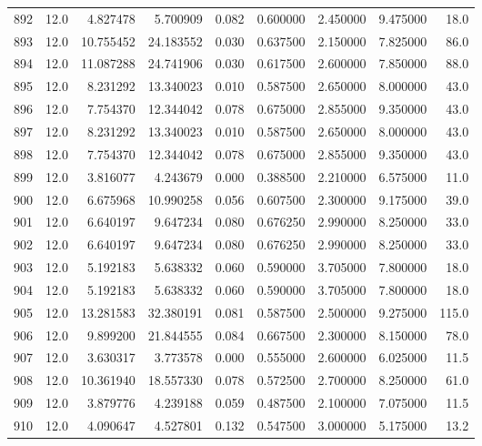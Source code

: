 \begin{tabular}{lrrrrrrrr}
892  &   12.0 &   4.827478 &   5.700909 &  0.082 &  0.600000 &  2.450000 &   9.475000 &   18.0 \\
893  &   12.0 &  10.755452 &  24.183552 &  0.030 &  0.637500 &  2.150000 &   7.825000 &   86.0 \\
894  &   12.0 &  11.087288 &  24.741906 &  0.030 &  0.617500 &  2.600000 &   7.850000 &   88.0 \\
895  &   12.0 &   8.231292 &  13.340023 &  0.010 &  0.587500 &  2.650000 &   8.000000 &   43.0 \\
896  &   12.0 &   7.754370 &  12.344042 &  0.078 &  0.675000 &  2.855000 &   9.350000 &   43.0 \\
897  &   12.0 &   8.231292 &  13.340023 &  0.010 &  0.587500 &  2.650000 &   8.000000 &   43.0 \\
898  &   12.0 &   7.754370 &  12.344042 &  0.078 &  0.675000 &  2.855000 &   9.350000 &   43.0 \\
899  &   12.0 &   3.816077 &   4.243679 &  0.000 &  0.388500 &  2.210000 &   6.575000 &   11.0 \\
900  &   12.0 &   6.675968 &  10.990258 &  0.056 &  0.607500 &  2.300000 &   9.175000 &   39.0 \\
901  &   12.0 &   6.640197 &   9.647234 &  0.080 &  0.676250 &  2.990000 &   8.250000 &   33.0 \\
902  &   12.0 &   6.640197 &   9.647234 &  0.080 &  0.676250 &  2.990000 &   8.250000 &   33.0 \\
903  &   12.0 &   5.192183 &   5.638332 &  0.060 &  0.590000 &  3.705000 &   7.800000 &   18.0 \\
904  &   12.0 &   5.192183 &   5.638332 &  0.060 &  0.590000 &  3.705000 &   7.800000 &   18.0 \\
905  &   12.0 &  13.281583 &  32.380191 &  0.081 &  0.587500 &  2.500000 &   9.275000 &  115.0 \\
906  &   12.0 &   9.899200 &  21.844555 &  0.084 &  0.667500 &  2.300000 &   8.150000 &   78.0 \\
907  &   12.0 &   3.630317 &   3.773578 &  0.000 &  0.555000 &  2.600000 &   6.025000 &   11.5 \\
908  &   12.0 &  10.361940 &  18.557330 &  0.078 &  0.572500 &  2.700000 &   8.250000 &   61.0 \\
909  &   12.0 &   3.879776 &   4.239188 &  0.059 &  0.487500 &  2.100000 &   7.075000 &   11.5 \\
910  &   12.0 &   4.090647 &   4.527801 &  0.132 &  0.547500 &  3.000000 &   5.175000 &   13.2 \\

\end{tabular}
